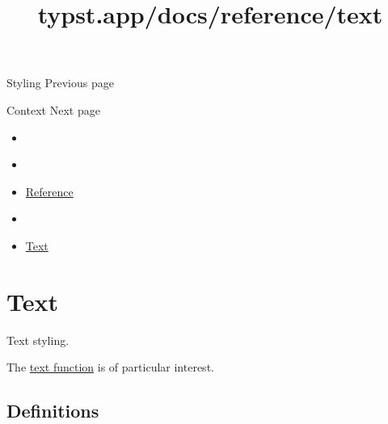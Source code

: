 { Styling } { Previous page }

\href{/docs/reference/context/}{\pandocbounded{}}

{ Context } { Next page }


\title{typst.app/docs/reference/text}

\begin{itemize}
\tightlist
\item
  \href{/docs}{}
\item
  
\item
  \href{/docs/reference/}{Reference}
\item
  
\item
  \href{/docs/reference/text/}{Text}
\end{itemize}

\section{Text}\label{summary}

Text styling.

The \href{/docs/reference/text/text/}{text function} is of particular
interest.

\subsection{Definitions}\label{definitions}

